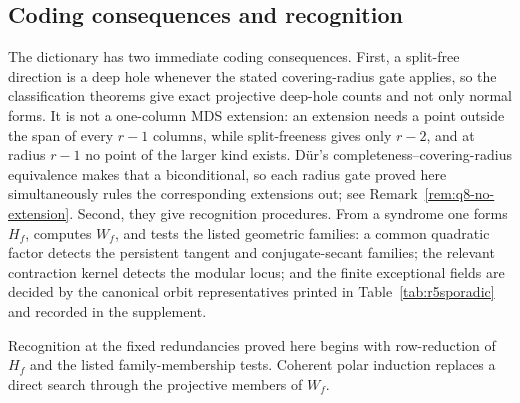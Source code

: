 \subsection{Coding consequences and recognition}

The dictionary has two immediate coding consequences.  First, a
split-free direction is a deep hole whenever the stated covering-radius
gate applies, so the classification theorems give exact projective
deep-hole counts and not only normal forms.  It is not a one-column MDS
extension: an extension needs a point outside the span of every
\(r-1\) columns, while split-freeness gives only \(r-2\), and at
radius \(r-1\) no point of the larger kind exists.  D\"ur's
completeness--covering-radius equivalence makes that a biconditional, so
each radius gate proved here simultaneously rules the corresponding
extensions out; see Remark~\ref{rem:q8-no-extension}.  Second,
they give recognition procedures.  From a syndrome one forms $H_f$,
computes $W_f$, and tests the listed geometric families: a common
quadratic factor detects the persistent tangent and conjugate-secant
families; the relevant contraction kernel detects the modular locus;
and the finite exceptional fields are decided by the canonical orbit
representatives printed in Table~\ref{tab:r5sporadic} and recorded in
the supplement.

Recognition at the fixed redundancies proved here begins with
row-reduction of \(H_f\) and the listed family-membership tests.
Coherent polar induction replaces a direct search through the
projective members of \(W_f\).
